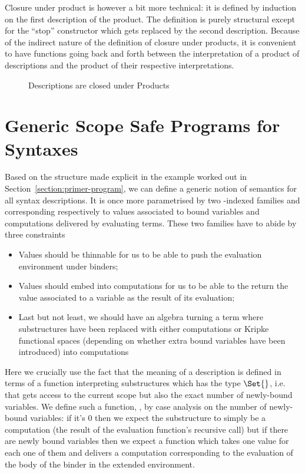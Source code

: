 Closure under product is however a bit more technical: it is
defined by induction on the first description of the product.
The definition is purely structural except for the ``stop''
constructor which gets replaced by the second description. Because
of the indirect nature of the definition of closure under
products, it is convenient to have functions going back and
forth between the interpretation of a product of descriptions
and the product of their respective interpretations.

\begin{figure}[h]
\begin{minipage}{0.45\textwidth}
\end{minipage}\hspace{2em}
\begin{minipage}{0.45\textwidth}
\end{minipage}
\caption{Descriptions are closed under Products}
\end{figure}


\section{Generic Scope Safe Programs for Syntaxes}\label{section:semantics}

Based on the structure made explicit in the example worked out
in Section~\ref{section:primer-program}, we can define a generic notion of
semantics for all syntax descriptions. It is once more parametrised
by two -indexed families  and  corresponding
respectively to values associated to bound variables and
computations delivered by evaluating terms. These two families
have to abide by three constraints
\begin{itemize}
\item Values should be thinnable for us to be able to push the
      evaluation environment under binders;
\item Values should embed into computations for us to be able
      to the return the value associated to a variable as the
      result of its evaluation;
\item Last but not least, we should have an algebra turning
      a term where substructures have been replaced with
      either computations or Kripke functional spaces (depending
      on whether extra bound variables have been introduced)
      into computations
\end{itemize}
Here we crucially use the fact that the meaning of a description is
defined in terms of a function interpreting substructures which has
the type     $\Set{}$, i.e. that gets access
to the current scope but also the exact number of newly-bound variables.
We define such a function, , by case analysis on the number
of newly-bound variables: if it's $0$ then we expect the substructure
to simply be a computation (the result of the evaluation function's
recursive call) but if there are newly bound variables then we expect
a function which takes one value for each one of them and delivers
a computation corresponding to the evaluation of the body of the binder
in the extended environment.

